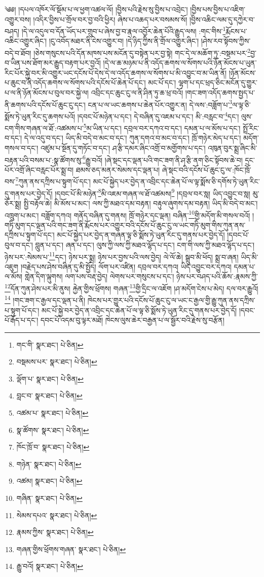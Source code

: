 \setcounter{footnote}{0} 
༄༅། །དཔལ་འཁོར་ལོ་སྡོམ་པ་ལ་ཕྱག་འཚལ་ལོ། །བྱིས་པའི་རྗེས་སུ་བྱིས་པ་འབྲེང་། །བྱིས་པས་བྱིས་པ་འཇིག་འགྱུར་བས། །འདིར་བྱིས་པ་གྲོལ་བར་བྱ་བའི་ཕྱིར། ཞེས་པ་འཆད་པར་བསམས་སོ། །བྱིས་འཆིང་ལམ་དུ་དཀྱེར་བ་བཤད། །དེ་ལ་འདུལ་བ་དོན་ཡོད་པར་གྲུབ་པ་ཞེས་བྱ་བ་རྣལ་འབྱོར་ཆེན་པོའི་རྒྱུད་ལས། :གང་གིས་\footnote{གང་གི་  སྣར་ཐང་།  པེ་ཅིན། }རྨོངས་པ་འཆིང་འགྱུར་ཞིང་། །ངུ་འབོད་མཐར་ནི་ངེས་འགྱུར་བ། །དེ་ཉིད་ཀྱིས་ནི་གྲོལ་འགྱུར་ཞིང་། །ཤེས་རབ་སྟོབས་ཀྱིས་བདེ་བ་ཐོབ། །ཅེས་གསུངས་པའི་དོན་མཁས་པས་མངོན་དུ་བསྟེན་པར་བྱ་སྟེ། གང་དེ་ལ་མཆོག་ཏུ་:བསྡམ་པར་\footnote{བསྡམས་པར་  སྣར་ཐང་།  པེ་ཅིན། }བྱ་བ་ཡིན་པས་ཐོག་མར་རྒྱུད་བརྟག་པར་བྱའོ། །དེ་ལ་ཆ་མཉམ་པ་ནི་འདོད་ཆགས་ལ་སོགས་པའི་ཉོན་མོངས་པ་ཡུན་རིང་པོར་སྐྱེ་བར་མི་འགྱུར་ཡང་དངོས་པོ་དེས་དེ་ལ་འདོད་ཆགས་ལ་སོགས་པ་མི་འབྱུང་བ་མ་ཡིན་ནོ། །ཉོན་མོངས་པ་ཆུང་བ་ནི་འདོད་ཆགས་ལ་སོགས་པའི་དངོས་པོ་ཆེན་པོ་དང་། མང་པོ་དང་། ལྷག་པ་དང་ཕྲད་ཅིང་མངོན་དུ་གྱུར་པ་ལ་ནི་ཉོན་མོངས་པ་བུལ་བར་སྐྱེ་ལ། འབྲིང་དང་ཆུང་ངུ་ལ་ནི་ཤིན་ཏུ་ཆ་ཕྲ་བའོ། །གང་ཟག་འདོད་ཆགས་སྤྱད་པ་ནི་ཆགས་པའི་དངོས་པོ་ཆུང་ངུ་དང་། ངན་པ་ལ་ཡང་ཆགས་པ་ཆེན་པོར་འགྱུར་ན། དེ་ལས་:བཟློག་པ་\footnote{ལྡོག་པ་  སྣར་ཐང་།  པེ་ཅིན། }ལ་ལྟ་ཅི་སྨོས་ཏེ་ཡུན་རིང་དུ་ཆགས་པའོ། །དབང་པོ་མཉེན་པ་དང་། དེ་བཞིན་དུ་འཇམ་པ་དང་། མི་:བརླང་བ་\footnote{བླང་བ་  སྣར་ཐང་།  པེ་ཅིན། }དང་། ལུས་ངག་གིས་གཞན་ལ་ཐོ་:འཚམས་པ་\footnote{འཚམ་པ་  སྣར་ཐང་།  པེ་ཅིན། }མ་ཡིན་པ་དང་། དབྲལ་བར་དཀའ་བ་དང་། དམན་པ་ལ་མོས་པ་དང་། སྤྲོ་རིང་བ་དང་། དེ་ལ་འདུ་བ་དང་། ཡིད་མི་བདེ་བ་མང་བ་དང་། ཀུན་དགའ་བ་མང་བ་དང་། ཁྲོ་གཉེར་མེད་པ་དང་། མདོག་གསལ་བ་དང་། འཛུམ་པ་སྔོན་དུ་གཏོང་བ་དང་། ཤ་རྩི་དམར་ཞིང་འགྲོ་བ་མགྱོགས་པ་དང་། འཁུན་བུར་སྨྲ་ཞིང་མི་བརྟན་པའི་བསམ་པ་:སྣ་ཚོགས་སུ་\footnote{སྣ་ཚོགས་  སྣར་ཐང་།  པེ་ཅིན། }རྒྱུ་བའོ། །ཞེ་སྡང་དང་ལྡན་པའི་གང་ཟག་ནི་ཤ་རྩི་ནག་ཅིང་སྟོབས་ཆེ་བ། དྲང་པོར་འགྲོ་ཞིང་བརླང་པོར་སྨྲ་བ། ཐམས་ཅད་མནར་སེམས་དང་ལྡན་པ། ཞེ་སྡང་བའི་དངོས་པོ་ཆུང་ངུ་ལ་:ཁོང་ཁྲོ་བས་\footnote{ཁོང་ཁྲོ་བ་  སྣར་ཐང་།  པེ་ཅིན། }ཀུན་ནས་དཀྲིས་པ་སྟུག་པོ་དང་། མང་པོ་སྐྱེད་པར་བྱེད་ན་འབྲིང་དང་ཆེན་པོ་ལ་ལྟ་སྨོས་ཅི་དགོས་ཏེ་ཡུན་རིང་དུ་གནས་པར་བྱེད་དོ། །དབང་པོ་མི་མཉེན་\footnote{གཉེན་  སྣར་ཐང་།  པེ་ཅིན། }མི་འཇམ་གཞན་ལ་ཐོ་འཚམས།\footnote{འཚམ།  སྣར་ཐང་།  པེ་ཅིན། } །དབྲལ་བར་སླ། ཡིད་འབྱུང་བ་སླ། མུ་ཅོར་སྨྲ། སྤྱི་བརྟོལ་ཆེ། མི་མོས་པ་མང་། ལས་ཀྱི་མཐའ་དམ་བརྟན། བརྟུལ་ཞུགས་དམ་བརྟན། ཡིད་མི་བདེ་བ་མང་། འཁྲུག་པ་མང་། བཟློག་དཀའ། གནོད་བཞིན་དུ་གནས། ཁྲོ་གཉེར་དང་ལྡན། བཞིན་\footnote{གཞིན་  སྣར་ཐང་།  པེ་ཅིན། }གྱི་མདོག་མི་གསལ་བའོ། །གཏི་མུག་དང་ལྡན་པའི་གང་ཟག་ནི་རྨོངས་པར་འགྱུར་བའི་དངོས་པོ་ཆུང་ངུ་ལ་ཡང་གཏི་མུག་གིས་ཀུན་ནས་དཀྲིས་པ་སྟུག་པོ་དང་། མང་པོ་སྐྱེད་པར་བྱེད་ན་གཞན་ལྟ་ཅི་སྨོས་ཏེ་ཡུན་རིང་དུ་གནས་པར་བྱེད་དོ། །དབང་པོ་བུལ་བ་དང་། བླུན་པ་དང་། ཞན་པ་དང་། ལུས་ཀྱི་ལས་ཀྱི་མཐའ་ལྷོད་པ་དང་། ངག་གི་ལས་ཀྱི་མཐའ་ལྷོད་པ་དང་། ཉེས་པར་:སེམས་པ་\footnote{སེམས་དཔའ་  སྣར་ཐང་།  པེ་ཅིན། }དང་། ཉེས་པར་སྨྲ། ཉེས་པར་བྱས་པའི་ལས་བྱེད། ལེ་ལོ་ཆེ། སྒྲུབ་མི་ཕོད། སྨྲ་བ་ཞན། ཡིད་མི་འཇུག །བརྗེད་པས་ཤེས་བཞིན་དུ་མི་སྤྱོད། ལོག་པར་འཛིན། དབྲལ་བར་དཀའ། ཡིད་འབྱུང་བར་དཀའ། དམན་པ་ལ་མོས། གླེན་དིག་ལྐུགས། ལག་པས་བརྡ་བྱེད། ལེགས་པར་གསུངས་པ་དང་། ཉེས་པར་བཤད་པའི་ཆོས་:རྣམས་ཀྱི་\footnote{རྣམས་ཀྱིས་  སྣར་ཐང་།  པེ་ཅིན། }དོན་ཀུན་ཤེས་པར་མི་ནུས། རྐྱེན་གྱིས་ཕྲོགས། གཞན་\footnote{གཞན་གྱིས་ཕྲོགས་གཞན་  སྣར་ཐང་།  པེ་ཅིན། }གྱི་དྲིང་ལ་འཇོག །ཤ་མདོག་ངེས་པ་མེད། དལ་བར་རྒྱུའོ།\footnote{རྒྱུ་བའོ།  སྣར་ཐང་།  པེ་ཅིན། } །གང་ཟག་ང་རྒྱལ་དང་ལྡན་པ་ནི། ཁེངས་པར་གྱུར་པའི་དངོས་པོ་ཆུང་ངུ་ལ་ཡང་ང་རྒྱལ་གྱི་རྒྱུ་ཀུན་ནས་དཀྲིས་པ་སྟུག་པོ་དང་། མང་པོ་སྐྱེ་བར་བྱེད་ན་འབྲིང་དང་ཆེན་པོ་ལ་ལྟ་ཅི་སྨོས་ཏེ་ཡུན་རིང་དུ་གནས་པར་བྱེད་དོ། །དབང་པོ་རྒོད་པ་དང་། དབང་པོ་འདམ་བུ་ལྟར་མཐོ། ཁེངས་ལུས་ཆེར་བརྒྱན་པ་ལ་སྦྱོར་བའི་རྗེས་སུ་བརྩོན། 